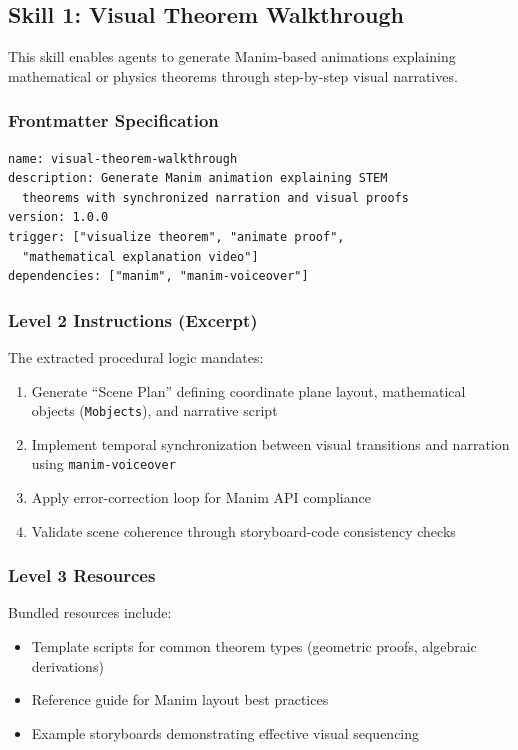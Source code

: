 \documentclass[11pt,a4paper]{article}
\begin{document}
\subsection{Skill 1: Visual Theorem Walkthrough}

This skill enables agents to generate Manim-based animations explaining mathematical or physics theorems through step-by-step visual narratives.

\subsubsection{Frontmatter Specification}

\begin{verbatim}
name: visual-theorem-walkthrough
description: Generate Manim animation explaining STEM 
  theorems with synchronized narration and visual proofs
version: 1.0.0
trigger: ["visualize theorem", "animate proof", 
  "mathematical explanation video"]
dependencies: ["manim", "manim-voiceover"]
\end{verbatim}

\subsubsection{Level 2 Instructions (Excerpt)}

The extracted procedural logic mandates:

\begin{enumerate}
\item Generate ``Scene Plan'' defining coordinate plane layout, mathematical objects (\texttt{Mobjects}), and narrative script \cite{arxivpdf2024tea, arxiv2024visualstory}
\item Implement temporal synchronization between visual transitions and narration using \texttt{manim-voiceover} \cite{github2024tea}
\item Apply error-correction loop for Manim API compliance
\item Validate scene coherence through storyboard-code consistency checks
\end{enumerate}

\subsubsection{Level 3 Resources}

Bundled resources include:

\begin{itemize}
\item Template scripts for common theorem types (geometric proofs, algebraic derivations)
\item Reference guide for Manim layout best practices
\item Example storyboards demonstrating effective visual sequencing
\end{itemize}
\end{document}
